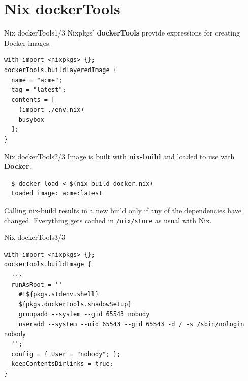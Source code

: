\documentclass[12pt,aspectratio=169]{beamer}
\begin{document}

\section{Nix dockerTools}


\begin{frame}[fragile]{Nix dockerTools\hfill1/3}
  Nixpkgs' \textbf{dockerTools} provide expressions for creating Docker images.
  \begin{verbatim}
with import <nixpkgs> {};
dockerTools.buildLayeredImage {
  name = "acme";
  tag = "latest";
  contents = [
    (import ./env.nix)
    busybox
  ];
}
  \end{verbatim}
\end{frame}


\begin{frame}[fragile]{Nix dockerTools\hfill2/3}
  Image is built with \textbf{nix-build} and loaded to use with \textbf{Docker}.
  \par
  \vspace{0.5cm}
  \begin{verbatim}
  $ docker load < $(nix-build docker.nix)
  Loaded image: acme:latest
  \end{verbatim}
  \par
  \vspace{0.5cm}
  Calling nix-build results in a new build only if any of the dependencies have changed. Everything gets cached in \texttt{/nix/store} as usual with Nix.
\end{frame}


\begin{frame}[fragile]{Nix dockerTools\hfill3/3}
  \begin{verbatim}
with import <nixpkgs> {};
dockerTools.buildImage {
  ...
  runAsRoot = ''
    #!${pkgs.stdenv.shell}
    ${pkgs.dockerTools.shadowSetup}
    groupadd --system --gid 65543 nobody
    useradd --system --uid 65543 --gid 65543 -d / -s /sbin/nologin nobody
  '';
  config = { User = "nobody"; };
  keepContentsDirlinks = true;
}
  \end{verbatim}
\end{frame}
\end{document}
